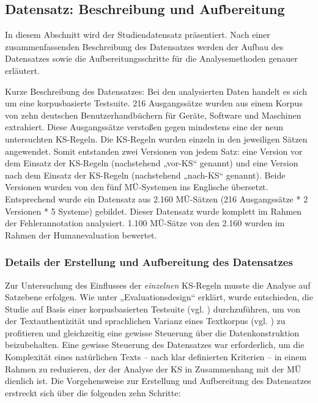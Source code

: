 \subsection{Datensatz: Beschreibung und Aufbereitung}
\label{sec:4.4.3}
In diesem Abschnitt wird der Studiendatensatz präsentiert. Nach einer zusammenfassenden Beschreibung des Datensatzes werden der Aufbau des Datensatzes sowie die Aufbereitungsschritte für die Analysemethoden genauer erläutert.

{Kurze Beschreibung des Datensatzes:} Bei den analysierten Daten handelt es sich um eine korpusbasierte Testsuite. 216 Ausgangssätze wurden aus einem Korpus von zehn deutschen Benutzerhandbüchern für Geräte, Software und Maschinen extrahiert. Diese Ausgangssätze verstoßen gegen mindestens eine der neun untersuchten KS-Regeln. Die KS-Regeln wurden einzeln in den jeweiligen Sätzen angewendet. Somit entstanden zwei Versionen von jedem Satz: eine Version vor dem Einsatz der KS-Regeln (nachstehend „vor-KS“ genannt) und eine Version nach dem Einsatz der KS-Regeln (nachstehend „nach-KS“ genannt). Beide Versionen wurden von den fünf MÜ-Systemen ins Englische übersetzt. Entsprechend wurde ein Datensatz aus 2.160 MÜ-Sätzen (216 Ausgangssätze * 2 Versionen * 5 Systeme) gebildet. Dieser Datensatz wurde komplett im Rahmen der Fehlerannotation analysiert. 1.100 MÜ-Sätze von den 2.160 wurden im Rahmen der Humanevaluation bewertet.

\subsubsection{\label{sec:4.4.3.1}Details der Erstellung und Aufbereitung des Datensatzes}

Zur Untersuchung des Einflusses der \textit{einzelnen} KS-Regeln musste die Analyse auf Satzebene erfolgen. Wie unter  „Evaluationsdesign“ erklärt, wurde entschieden, die Studie auf Basis einer korpusbasierten Testsuite (vgl. \citealt{BalkanFouvry1995}) durchzuführen, um von der Textauthentizität und sprachlichen Varianz eines Textkorpus (vgl. \citealt{Engelberg2009}) zu profitieren und gleichzeitig eine gewisse Steuerung über die Datenkonstruktion beizubehalten. Eine gewisse Steuerung des Datensatzes war erforderlich, um die Komplexität eines natürlichen Texts -- nach klar definierten Kriterien -- in einem Rahmen zu reduzieren, der der Analyse der KS in Zusammenhang mit der MÜ dienlich ist. Die Vorgehensweise zur Erstellung und Aufbereitung des Datensatzes erstreckt sich über die folgenden zehn Schritte:

